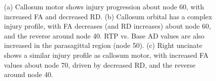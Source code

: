 \documentclass[12pt]{article}
\begin{document}
\begin{figure}[H]
	\caption{(a) Callosum motor shows injury progression about node 60, with increased FA and decreased RD. (b) Callosum orbital has a complex injury profile, with FA decreases (and RD increases) about node 60, and the reverse around node 40. RTP vs. Base AD values are also increased in the parasagittal region (node 50). (c) Right uncinate shows a similar injury profile as callosum motor, with increased FA values about node 70, driven by decreased RD, and the reverse around node 40.}
	\label{supp-fig:lgio-gam-prog}
\end{figure}
\end{document}
